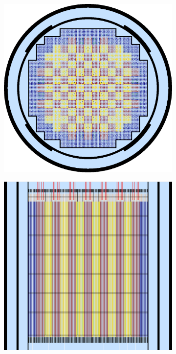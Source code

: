 \begin{figure}[h!]
\begin{subfigure}{\textwidth}
  \centering
  \includegraphics[width=5in]{figures/workflow/openmc/core}
  \caption{}
\end{subfigure}
\begin{subfigure}{\textwidth}
  \centering
  \includegraphics[width=5in]{figures/workflow/openmc/core_axial}

\end{subfigure}
\end{figure}
